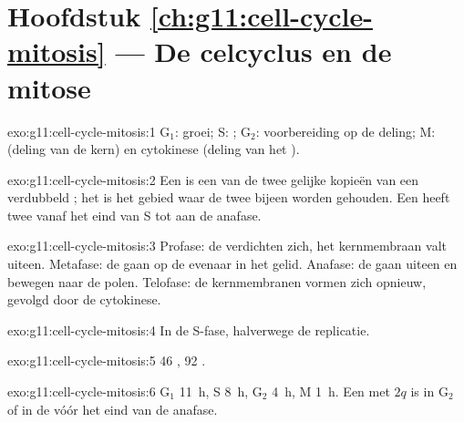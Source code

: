 \section*{Hoofdstuk \ref{ch:g11:cell-cycle-mitosis} --- De celcyclus en de mitose}

\begin{solution}{exo:g11:cell-cycle-mitosis:1}
$\mathrm{G_1}$: groei; S: ; $\mathrm{G_2}$: voorbereiding
op de deling; M:  (deling van de kern) en cytokinese (deling van
het ).
\end{solution}

\begin{solution}{exo:g11:cell-cycle-mitosis:2}
Een  is een van de twee gelijke kopieën van een verdubbeld
; het  is het gebied waar de twee bijeen worden
gehouden. Een  heeft twee  vanaf het eind van S tot
aan de anafase.
\end{solution}

\begin{solution}{exo:g11:cell-cycle-mitosis:3}
Profase: de  verdichten zich, het kernmembraan valt uiteen.
Metafase: de  gaan op de evenaar in het gelid. Anafase: de
 gaan uiteen en bewegen naar de polen. Telofase: de
kernmembranen vormen zich opnieuw, gevolgd door de cytokinese.
\end{solution}

\begin{solution}{exo:g11:cell-cycle-mitosis:4}
In de S-fase, halverwege de replicatie.
\end{solution}

\begin{solution}{exo:g11:cell-cycle-mitosis:5}
46 , 92 .
\end{solution}

\begin{solution}{exo:g11:cell-cycle-mitosis:6}
$\mathrm{G_1}$ \qty{11}{h}, S \qty{8}{h}, $\mathrm{G_2}$ \qty{4}{h},
M \qty{1}{h}. Een  met $2q$ is in $\mathrm{G_2}$ of in de  vóór
het eind van de anafase.
\end{solution}

